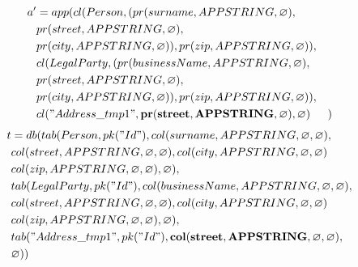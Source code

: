 \documentclass[11pt]{article}
\begin{document}
\hline
\begin{align*}
a' &=app(cl(Person, (pr(surname, APPSTRING, \varnothing), \\
& pr(street, APPSTRING, \varnothing), \\
& pr(city, APPSTRING, \varnothing)), pr(zip, APPSTRING, \varnothing)), \\
& cl(LegalParty, (pr(businessName, APPSTRING, \varnothing), \\
& pr(street, APPSTRING, \varnothing), \\
& pr(city, APPSTRING, \varnothing)), pr(zip, APPSTRING, \varnothing)), \\
& cl("Address\_tmp1", \mathbf{pr(street, APPSTRING, \varnothing)} , \varnothing)
& )
\end{align*}
\begin{align*}
t &=db(tab(Person, pk("Id"), col(surname, APPSTRING, \varnothing, \varnothing), \\
& col(street, APPSTRING, \varnothing, \varnothing), col(city, APPSTRING, \varnothing, \varnothing) \\
& col(zip, APPSTRING, \varnothing, \varnothing), \varnothing), \\
& tab(LegalParty, pk("Id"),  col(businessName, APPSTRING, \varnothing, \varnothing), \\
& col(street, APPSTRING, \varnothing, \varnothing), col(city, APPSTRING, \varnothing, \varnothing) \\
& col(zip, APPSTRING, \varnothing, \varnothing), \varnothing), \\
& tab("Address\_tmp1", pk("Id"), \mathbf{col(street, APPSTRING, \varnothing, \varnothing)},\\
& \varnothing)) 
\end{align*}
\end{document}
